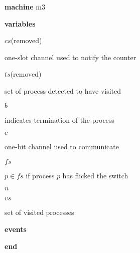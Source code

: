 \begin{block}
  \item   \textbf{machine} m3
  \item   \textbf{variables}
  \begin{block}
    \item   $cs$\quad(removed)
    \item   \begin{block}
      \item   one-slot channel used to notify the counter 
    \end{block}
    \item   $ts$\quad(removed)
    \item   \begin{block}
      \item   set of process detected to have visited
    \end{block}
    \item   $b$
    \item   \begin{block}
      \item    indicates termination of the process 
    \end{block}
    \item   $c$
    \item   \begin{block}
      \item    one-bit channel used to communicate 
    \end{block}
    \item   $fs$
    \item   \begin{block}
      \item    $p \in fs$ if process $p$ has flicked the switch 
    \end{block}
    \item   $n$
    \item   $vs$
    \item   \begin{block}
      \item   set of visited processes
    \end{block}
  \end{block}
  \item   
  \item   
  \item   \textbf{events}
  \begin{block}
    \item   
    \item   
    \item   
    \item   
  \end{block}
  \item   \textbf{end} \\
\end{block}
